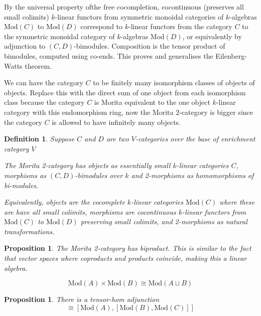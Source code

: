 \documentclass{tufte-book}
\newtheorem{definition}[theorem]{Definition}
\newtheorem{proposition}[theorem]{Proposition}
\begin{document}
By the universal property ofthe free cocompletion, cocontinuous (preserves all small colimits) $k$-linear functors from symmetric monoidal categories of $k$-algebras $\mathrm{Mod}(C)$ to $\mathrm{Mod}(D)$ correspond to $k$-linear functors from the category $C$ to the symmetric monoidal category of $k$-algebras $\mathrm{Mod}(D)$, or equivalently by adjunction to $(C,D)$-bimodules. Composition is the tensor product of bimodules, computed using co-ends. This proves and generalises the Eilenberg-Watts theorem.

We can have the category $C$ to be finitely many isomorphism classes of objects of objects. Replace this with the direct sum of one object from each isomorphism class because the category $C$ is Morita equivalent to the one object $k$-linear category with this endomorphism ring, now the Morita $2$-category is bigger since the category $C$ is allowed to have infinitely many objects.

\begin{definition}
	Suppose $C$ and $D$ are two $V$-categories over the base of enrichment category $V$

	The Morita 2-category has objects as essentially small $k$-linear categories $C$, morphisms as $(C,D)$-bimodules over $k$ and 2-morphisms as homomorphisms of bi-modules.

	Equivalently, objects are the cocomplete $k$-linear categories $\mathrm{Mod}(C)$ where these are have all small colimits, morphisms are cocontinuous $k$-linear functors from $\mathrm{Mod}(C)$ to $\mathrm{Mod}(D)$ preserving small colimits, and 2-morphisms as natural transformations.
\end{definition}

\begin{proposition}
	The Morita 2-category has biproduct.
	This is similar to the fact that vector spaces where coproducts and products coincide, making this a linear algebra.

	\begin{equation}
		\mathrm{Mod}(A) \times \mathrm{Mod}(B)
		\cong \mathrm{Mod}(A \sqcup B)
	\end{equation}
\end{proposition}

\begin{proposition}
	There is a tensor-hom adjunction
	\begin{equation}
		[\mathrm{Mod}(A) \otimes \mathrm{Mod}(B), \mathrm{Mod}(C)]
		\cong
		[\mathrm{Mod}(A), [\mathrm{Mod}(B), \mathrm{Mod}(C)]]
	\end{equation}
\end{proposition}
\end{document}
